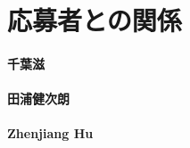 \documentclass[dvipdfmx]{jsarticle}
\begin{document}
\section*{応募者との関係}
\paragraph{千葉滋}

\paragraph{田浦健次朗}

\paragraph{Zhenjiang Hu}
\end{document}
